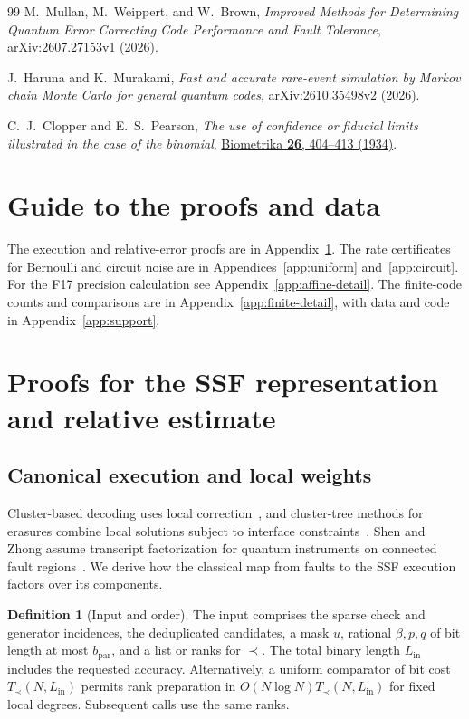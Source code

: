 \documentclass[10pt,twocolumn]{article}
\theoremstyle{definition}
\newtheorem{definition}{Definition}
\newcommand{\Lin}{L_{\mathrm{in}}}
\newcommand{\bpar}{b_{\mathrm{par}}}
\newcommand{\Tprec}{T_{\prec}}
\begin{document}
\begin{thebibliography}{99}
M.~Mullan, M.~Weippert, and W.~Brown,
\emph{Improved Methods for Determining Quantum Error Correcting Code Performance and Fault Tolerance},
\href{https://arxiv.org/abs/2607.27153v1}{arXiv:2607.27153v1} (2026).

J.~Haruna and K.~Murakami,
\emph{Fast and accurate rare-event simulation by Markov chain Monte Carlo for general quantum codes},
\href{https://arxiv.org/abs/2610.35498v2}{arXiv:2610.35498v2} (2026).

C.~J.~Clopper and E.~S.~Pearson,
\emph{The use of confidence or fiducial limits illustrated in the case of the binomial},
\href{https://doi.org/10.1093/biomet/26.4.404}{Biometrika \textbf{26}, 404--413 (1934)}.

\end{thebibliography}

\flushcolsend\clearpage\raggedcolsend
\appendix
\section*{Guide to the proofs and data}
The execution and relative-error proofs are in Appendix~\ref{app:core}.
The rate certificates for Bernoulli and circuit noise are in
Appendices~\ref{app:uniform} and~\ref{app:circuit}. For the F17
precision calculation see Appendix~\ref{app:affine-detail}. The
finite-code counts and comparisons are in Appendix~\ref{app:finite-detail},
with data and code in Appendix~\ref{app:support}.

\section{Proofs for the SSF representation and relative estimate}\label{app:core}
\subsection{Canonical execution and local weights}\label{app:execution-proofs}
Cluster-based decoding uses local correction~\cite[Def.~8]{LEB26}, and
cluster-tree methods for erasures combine local solutions subject to
interface constraints~\cite[Sec.~III]{YGP24}. Shen and Zhong assume
transcript factorization for quantum instruments on connected fault
regions~\cite[Methods]{SZ26}. We derive how the classical map from faults
to the SSF execution factors over its components.

\begin{definition}[Input and order]\label{def:contract}
The input comprises the sparse check and generator incidences, the
deduplicated candidates, a mask $u$, rational $\beta,p,q$ of bit
length at most $\bpar$, and a list or ranks for $\prec$. The total
binary length $\Lin$ includes the requested accuracy. Alternatively,
a uniform comparator of bit cost $\Tprec(N,\Lin)$ permits rank
preparation in $O(N\log N)\Tprec(N,\Lin)$ for fixed local degrees.
Subsequent calls use the same ranks.
\end{definition}
\end{document}
